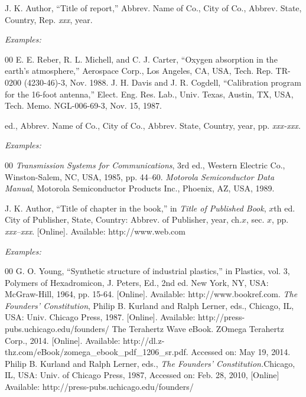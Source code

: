 \documentclass[journal,onecolumn,web]{ieeecolor}
\begin{document}

\noindent J. K. Author, ``Title of report,'' Abbrev. Name of Co., City of Co., Abbrev.
State, Country, Rep. {\it xxx}, year.

{\it Examples:}

\begin{thebibliography}{00}
 E. E. Reber, R. L. Michell, and C. J. Carter, ``Oxygen absorption in the earth's atmosphere,'' Aerospace Corp., Los Angeles, CA, USA, Tech. Rep. TR-0200 (4230-46)-3, Nov. 1988.
 J. H. Davis and J. R. Cogdell, ``Calibration program for the 16-foot antenna,'' Elect. Eng. Res. Lab., Univ. Texas, Austin, TX, USA, Tech. Memo. NGL-006-69-3, Nov. 15, 1987.
\end{thebibliography}


 ed., Abbrev. Name of Co., City of Co., Abbrev. State, Country, year, pp.
{\it xxx-xxx.}

{\it Examples:}{\vadjust{\vspace*{-2.5em}}}

\begin{thebibliography}{00}
 {\it Transmission Systems for Communications}, 3rd ed., Western Electric Co., Winston-Salem, NC, USA, 1985, pp. 44--60.
 {\it Motorola Semiconductor Data Manual}, Motorola Semiconductor Products Inc., Phoenix, AZ, USA, 1989.
\end{thebibliography}


\noindent J. K. Author, ``Title of chapter in the book,'' in {\it Title of Published Book}, $x$th ed. City of
Publisher, State, Country: Abbrev. of Publisher, year, ch.$x$, sec. $x$, pp.
{\it xxx--xxx}. [Online]. Available:  {http://www.web.com}




{\it Examples:}{\vadjust{\vspace*{-2.5em}}}

\begin{thebibliography}{00}
 G. O. Young, ``Synthetic structure of industrial plastics,'' in Plastics, vol. 3, Polymers of Hexadromicon, J. Peters, Ed., 2nd ed. New York, NY, USA: McGraw-Hill, 1964, pp. 15-64. [Online]. Available:  {http://www.bookref.com}.
 {\it The Founders' Constitution}, Philip B. Kurland and Ralph Lerner, eds., Chicago, IL, USA: Univ. Chicago Press, 1987. [Online]. Available:  {http://press-pubs.uchicago.edu/founders/}
 The Terahertz Wave eBook. ZOmega Terahertz Corp., 2014. [Online]. Available:  {http://dl.z-thz.com/eBook/zomega\_ebook\_pdf\_1206\_sr.pdf}. Accessed on: May 19, 2014.
 Philip B. Kurland and Ralph Lerner, eds., {\it The Founders' Constitution.}Chicago, IL, USA: Univ. of Chicago Press, 1987, Accessed on: Feb. 28, 2010, [Online] Available:  {http://press-pubs.uchicago.edu/founders/}
\end{thebibliography}
\end{document}
